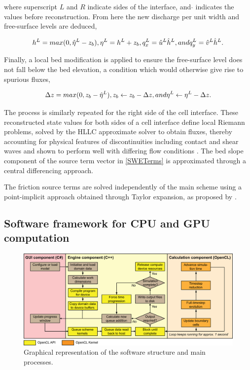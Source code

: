 where superscript \(L\) and \(R\) indicate sides of the interface, and \(\hat{}\) indicates the values before reconstruction. From here the new discharge per unit width and free-surface levels are deduced,

\begin{equation}
	\label{Reconstruction2}
		h^L = max( 0, \hat{\eta}^{L} - z_{b} ), \hfill
		\eta^L = h^L + z_b, \hfill
		q_x^L = \hat{u}^L\hat{h}^L, \hfill and \hfill
		q_y^L = \hat{v}^L\hat{h}^L . \hfill
\end{equation}

Finally, a local bed modification is applied to ensure the free-surface level does not fall below the bed elevation, a condition which would otherwise give rise to spurious fluxes,

\begin{equation}
	\label{Reconstruction3}
		\Delta{z} = max( 0, z_{b} - \hat{\eta}^{L} ), \hfill
		z_b \gets z_b - \Delta{z}, \hfill and \hfill
		\eta^L \gets \eta^L - \Delta{z} . \hfill
\end{equation}

The process is similarly repeated for the right side of the cell interface. These reconstructed state values for both sides of a cell interface define local Riemann problems, solved by the HLLC approximate solver to obtain fluxes, thereby accounting for physical features of discontinuities including contact and shear waves \citep{Toro1994} and shown to perform well with differing flow conditions \citep{Erduran2002}. The bed slope component of the source term vector in \eqref{SWETerms} is approximated through a central differencing approach. 

The friction source terms are solved independently of the main scheme using a point-implicit approach obtained through Taylor expansion, as proposed by \citet{Liang2010a}. 

\subsection{Software framework for CPU and GPU computation}

\begin{figure}[tpb]
\centering
\includegraphics[width=1.0\textwidth]{carlisle-figures/Figure1.png}
\caption{Graphical representation of the software structure and main processes.}
\label{SoftwareProcesses}
\end{figure}


